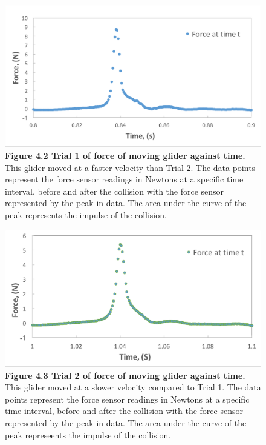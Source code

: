 \documentclass[11pt]{report}
\begin{document}
\begin{figure}[h!]
    \includegraphics[width=\linewidth]{ForceTime1.png}
    \captionsetup{labelformat=empty}
    \caption{\textbf{Figure 4.2 Trial 1 of force of moving glider against time.}
    This glider moved at a faster velocity than Trial 2.  The data points
represent the force sensor readings in Newtons at a specific time interval, before and
after the collision with the force sensor represented by the peak in data.  The area under the curve
of the peak represents the impulse of the collision.}
\end{figure}

\begin{figure}[h!]
    \includegraphics[width=\linewidth]{ForceTime2.png}
    \captionsetup{labelformat=empty}
    \caption{\textbf{Figure 4.3 Trial 2 of force of moving glider against time.}
    This glider moved at a slower velocity compared to Trial 1. The data points
represent the force sensor readings in Newtons at a specific time interval,
before and after the collision with the force sensor represented by the peak in
data.  The area under the curve of the peak represeents the impulse of the
collision.}
\end{figure}
\end{document}
